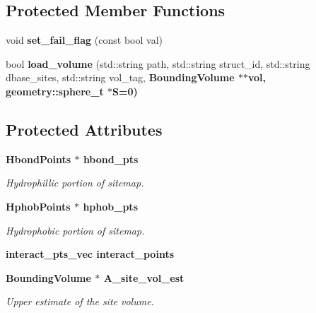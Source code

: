 \subsection*{Protected Member Functions}
\begin{CompactItemize}
\item 
void \textbf{set\_\-fail\_\-flag} (const bool val)\label{classASCbase_1_1Sitemap_e250f1412ec1750e343811d8582cd562}

\item 
bool \textbf{load\_\-volume} (std::string path, std::string struct\_\-id, std::string dbase\_\-sites, std::string vol\_\-tag, \bf{Bounding\-Volume} $\ast$$\ast$vol, geometry::sphere\_\-t $\ast$S=0)\label{classASCbase_1_1Sitemap_79a3b9c79bdd450b23932618525d67ae}

\end{CompactItemize}
\subsection*{Protected Attributes}
\begin{CompactItemize}
\item 
\bf{Hbond\-Points} $\ast$ \bf{hbond\_\-pts}\label{classASCbase_1_1Sitemap_dcd2dacc1cda6d35e9e477e38ab1af5b}

\begin{CompactList}\small\item\em Hydrophillic portion of sitemap. \item\end{CompactList}\item 
\bf{Hphob\-Points} $\ast$ \bf{hphob\_\-pts}\label{classASCbase_1_1Sitemap_89271f4fedad4a8435ff3f30e58bb7f7}

\begin{CompactList}\small\item\em Hydrophobic portion of sitemap. \item\end{CompactList}\item 
\bf{interact\_\-pts\_\-vec} \textbf{interact\_\-points}\label{classASCbase_1_1Sitemap_ff5f52340679a7c4c44521a8f7218324}

\item 
\bf{Bounding\-Volume} $\ast$ \bf{A\_\-site\_\-vol\_\-est}\label{classASCbase_1_1Sitemap_cb78a63c2111c987ecd011d1dd3d1ce0}

\begin{CompactList}\small\item\em Upper estimate of the site volume. \item\end{CompactList}\end{CompactItemize}
